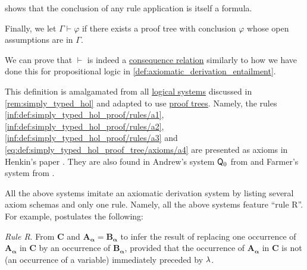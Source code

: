 \begin{definition}
\begin{thmenum}[series=def:simply_typed_hol_proof_tree]
     shows that the conclusion of any rule application is itself a formula.

     Finally, we let \( \Gamma \vdash \varphi \) if there exists a proof tree with conclusion \( \varphi \) whose open assumptions are in \( \Gamma \).
  \end{thmenum}
\end{definition}
\begin{defproof}
  We can prove that \( {\vdash} \) is indeed a \hyperref[def:consequence_relation]{consequence relation} similarly to how we have done this for propositional logic in \cref{def:axiomatic_derivation_entailment}.
\end{defproof}
\begin{comments}
  \item This definition is amalgamated from all \hyperref[con:logical_system]{logical systems} discussed in \cref{rem:simply_typed_hol} and adapted to use \hyperref[con:proof_tree]{proof trees}. Namely, the rules \ref{inf:def:simply_typed_hol_proof/rules/a1}, \ref{inf:def:simply_typed_hol_proof/rules/a2}, \ref{inf:def:simply_typed_hol_proof/rules/a3} and \eqref{eq:def:simply_typed_hol_proof_tree/axioms/a4} are presented as axioms in Henkin's paper \cite[37]{Henkin1975Identity}. They are also found in Andrew's system \( \textsf{\upshape Q}_0 \) from \cite[\S 51]{Andrews2002Logic} and Farmer's system from \cite[278]{Farmer2008STTVirtues}.

  All the above systems imitate an axiomatic derivation system by listing several axiom schemas and only one rule. Namely, all the above systems feature \enquote{rule R}. For example,  postulates the following:
  \begin{displayquote}
    \textit{Rule R}. From \( \mathbf{C} \) and \( \mathbf{A_\alpha} = \mathbf{B_\alpha} \) to infer the result of replacing one occurrence of \( \mathbf{A_\alpha} \) in \( \mathbf{C} \) by an occurrence of \( \mathbf{B_\alpha} \), provided that the occurrence of \( \mathbf{A_\alpha} \) in \( \mathbf{C} \) is not (an occurrence of a variable) immediately preceded by \( {\mathrm \lambda} \).
  \end{displayquote}


\end{comments}

